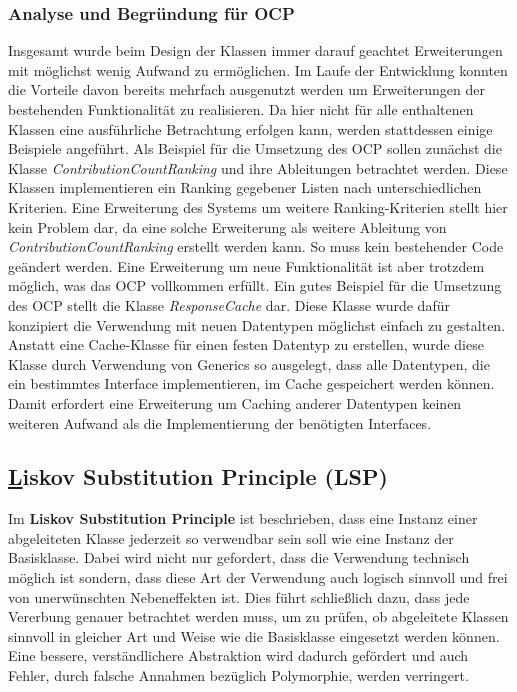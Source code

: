\subsubsection{Analyse und Begründung für OCP}
Insgesamt wurde beim Design der Klassen immer darauf geachtet Erweiterungen mit möglichst wenig Aufwand zu ermöglichen.
Im Laufe der Entwicklung konnten die Vorteile davon bereits mehrfach ausgenutzt werden um Erweiterungen der bestehenden Funktionalität zu realisieren.
Da hier nicht für alle enthaltenen Klassen eine ausführliche Betrachtung erfolgen kann, werden stattdessen einige Beispiele angeführt.
\label{sec:OCP_Strategy}
Als Beispiel für die Umsetzung des OCP sollen zunächst die Klasse \textit{ContributionCountRanking} und ihre Ableitungen betrachtet werden.
Diese Klassen implementieren ein Ranking gegebener Listen nach unterschiedlichen Kriterien.
Eine Erweiterung des Systems um weitere Ranking-Kriterien stellt hier kein Problem dar, da eine solche Erweiterung als weitere Ableitung von \textit{ContributionCountRanking} erstellt werden kann.
So muss kein bestehender Code geändert werden.
Eine Erweiterung um neue Funktionalität ist aber trotzdem möglich, was das OCP vollkommen erfüllt.
\newline
Ein gutes Beispiel für die Umsetzung des OCP stellt die Klasse \textit{ResponseCache} dar. 
Diese Klasse wurde dafür konzipiert die Verwendung mit neuen Datentypen möglichst einfach zu gestalten.
Anstatt eine Cache-Klasse für einen festen Datentyp zu erstellen, wurde diese Klasse durch Verwendung von Generics so ausgelegt, dass alle Datentypen, die ein bestimmtes Interface implementieren, im Cache gespeichert werden können.
Damit erfordert eine Erweiterung um Caching anderer Datentypen keinen weiteren Aufwand als die Implementierung der benötigten Interfaces.



\newpage
\subsection{\underline{L}iskov Substitution Principle (LSP)}
\label{sec:LSP}

Im \textbf{Liskov Substitution Principle} ist beschrieben, dass eine Instanz einer abgeleiteten Klasse jederzeit so verwendbar sein soll wie eine Instanz der Basisklasse.
Dabei wird nicht nur gefordert, dass die Verwendung technisch möglich ist sondern, dass diese Art der Verwendung auch logisch sinnvoll und frei von unerwünschten Nebeneffekten ist.
Dies führt schließlich dazu, dass jede Vererbung genauer betrachtet werden muss, um zu prüfen, ob abgeleitete Klassen sinnvoll in gleicher Art und Weise wie die Basisklasse eingesetzt werden können.
Eine bessere, verständlichere Abstraktion wird dadurch gefördert und auch Fehler, durch falsche Annahmen bezüglich Polymorphie, werden verringert.

